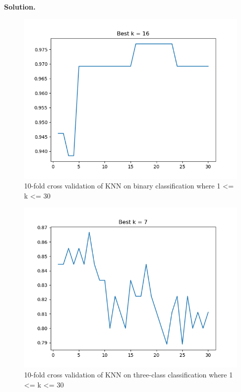 \documentclass[10pt]{article}
\begin{document}
\begin{itemize}
{\bf Solution.}

\begin{figure}[H]
\centering
  \includegraphics[width=\linewidth]{code/knn-cv-binary.png}
 \caption{10-fold cross validation of KNN on binary classification where 1 <= k <= 30}
\label{label}
\end{figure}

\begin{figure}[H]
\centering
  \includegraphics[width=\linewidth]{code/knn-cv-three.png}
 \caption{10-fold cross validation of KNN on three-class classification where 1 <= k <= 30}
\label{label}
\end{figure}



\end{itemize}
\end{document}
